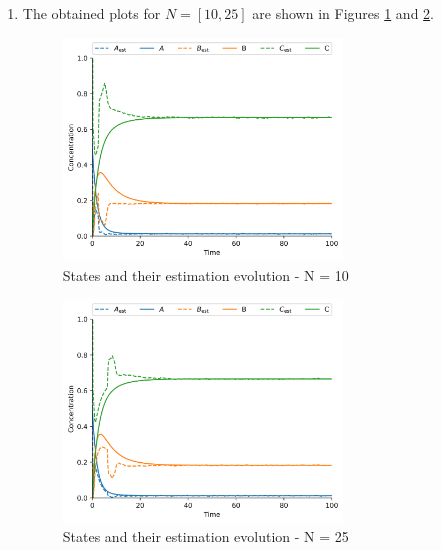 \documentclass[]{article}
\begin{document}
\begin{enumerate}
	\item The obtained plots for $N = [10, 25]$ are shown in Figures \ref{fig:assignment51_1} and \ref{fig:assignment51_2}.
	\begin{figure}[H]
		\centering
		\includegraphics[width=0.7\textwidth]{images/Assignment5_N=10_False.png}
		\caption{States and their estimation evolution - N = 10}
		\label{fig:assignment51_1}
	\end{figure}
	\begin{figure}[H]
		\centering
		\includegraphics[width=0.7\textwidth]{images/Assignment5_N=25_False.png}
		\caption{States and their estimation evolution - N = 25}
		\label{fig:assignment51_2}
	\end{figure}
	

\end{enumerate}
\end{document}
